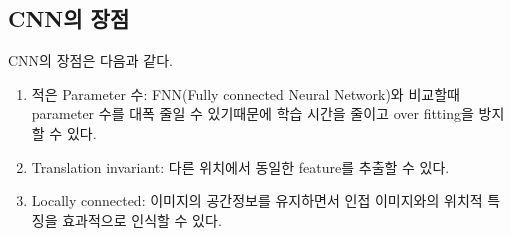 \subsection{CNN의 장점}
    CNN의 장점은 다음과 같다.
    \begin{enumerate}
        \item 적은 Parameter 수: FNN(Fully connected Neural Network)와 비교할때 parameter 수를 대폭 줄일 수 있기때문에 학습 시간을 줄이고 over fitting을 방지할 수 있다.
        \item Translation invariant: 다른 위치에서 동일한 feature를 추출할 수 있다.
        \item Locally connected: 이미지의 공간정보를 유지하면서 인접 이미지와의 위치적 특징을 효과적으로 인식할 수 있다.
    \end{enumerate}